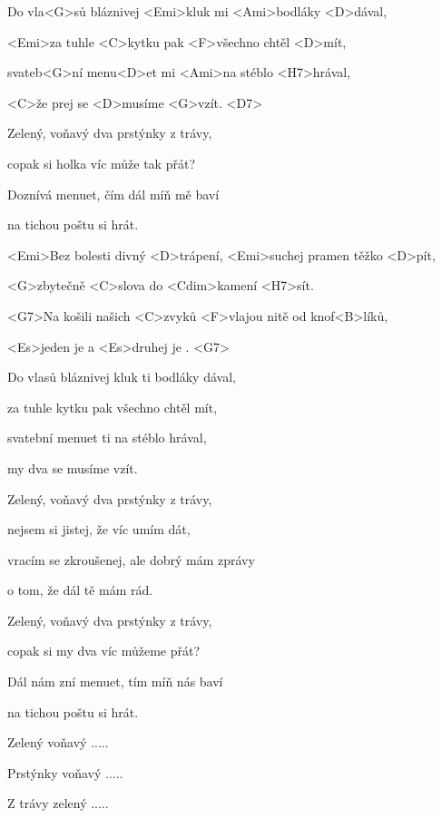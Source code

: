 

\zs
Do vla<G>sů bláznivej <Emi>kluk mi <Ami>bodláky <D>dával,

<Emi>za tuhle <C>kytku pak <F>všechno chtěl <D>mít,

svateb<G>ní menu<D>et mi <Ami>na stéblo <H7>hrával,

<C>že prej se <D>musíme <G>vzít. <D7>
\ks

\zs
Zelený, voňavý dva prstýnky z trávy,

copak si holka víc může tak přát?

Doznívá menuet, čím dál míň mě baví

na tichou poštu si hrát.
\ks

\zr
<Emi>Bez bolesti divný <D>trápení, <Emi>suchej pramen těžko <D>pít,

<G>zbytečně <C>slova do <Cdim>kamení <H7>sít.

<G7>Na košili našich <C>zvyků <F>vlajou nitě od 
knof<B>líků,

<Es>jeden je  a <Es>druhej je . <G7>
\kr

\zs
Do vlasů bláznivej kluk ti bodláky dával,

za tuhle kytku pak všechno chtěl mít,

svatební menuet ti na stéblo hrával,

my dva se musíme vzít.
\ks

\zs
Zelený, voňavý dva prstýnky z trávy,

nejsem si jistej, že víc umím dát,

vracím se zkroušenej, ale dobrý mám zprávy

o tom, že dál tě mám rád.
\ks

\zs
Zelený, voňavý dva prstýnky z trávy,

copak si my dva víc můžeme přát?

Dál nám zní menuet, tím míň nás baví

na tichou poštu si hrát.



Zelený voňavý .....

Prstýnky voňavý .....

Z trávy zelený .....
\ks
\kp
